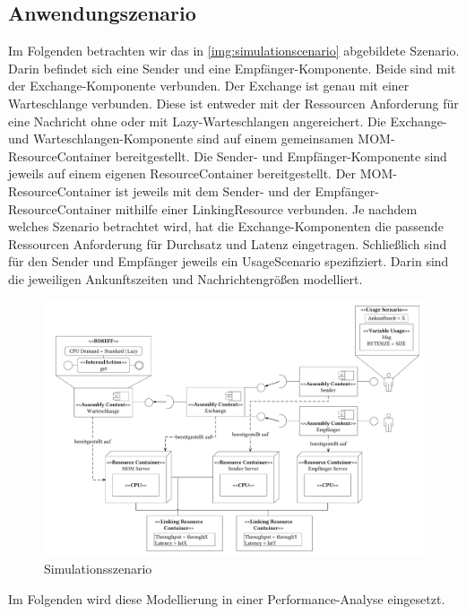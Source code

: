 \subsection{Anwendungszenario}
Im Folgenden betrachten wir das in \autoref{img:simulationscenario} abgebildete Szenario. Darin befindet sich eine Sender und eine Empfänger-Komponente. Beide sind mit der Exchange-Komponente verbunden. Der Exchange ist genau mit einer Warteschlange verbunden. Diese ist entweder mit der Ressourcen Anforderung für eine Nachricht ohne oder mit Lazy-Warteschlangen angereichert. Die Exchange- und Warteschlangen-Komponente sind auf einem gemeinsamen MOM-ResourceContainer bereitgestellt. Die Sender- und Empfänger-Komponente sind jeweils auf einem eigenen ResourceContainer bereitgestellt. Der MOM-ResourceContainer ist jeweils mit dem Sender- und der Empfänger-ResourceContainer mithilfe einer LinkingResource verbunden. Je nachdem welches Szenario betrachtet wird, hat die Exchange-Komponenten die passende Ressourcen Anforderung für Durchsatz und Latenz eingetragen. Schließlich sind für den Sender und Empfänger jeweils ein UsageScenario spezifiziert. Darin sind die jeweiligen Ankunftszeiten und Nachrichtengrößen modelliert.
\begin{figure}
\center
  \includegraphics[width=1.35\textwidth, angle=90]{images/modelling/modelingSimulationSzenario.pdf}
  \caption{Simulationsszenario }
  \label{img:simulationscenario}
\end{figure}
Im Folgenden wird diese Modellierung in einer Performance-Analyse eingesetzt.


